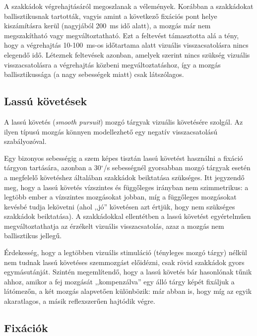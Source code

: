 A szakkádok végrehajtásáról megoszlanak a vélemények. Korábban a szakkádokat ballisztikusnak tartották, vagyis amint a következő fixációs pont helye kiszámításra kerül (nagyjából 200~ms idő alatt), a mozgás már nem megszakítható vagy megváltoztatható. \cite{carpenter_book} Ezt a feltevést támasztotta alá a tény, hogy a végrehajtás 10-100~ms-os időtartama alatt vizuális visszacsatolásra nincs elegendő idő. Léteznek feltevések azonban, amelyek szerint nincs szükség vizuális visszacsatolásra a végrehajtás közbeni megváltoztatáshoz, így a mozgás ballisztikussága (a nagy sebességek miatt) csak látszólagos. \cite{zee}

\subsection{Lassú követések}\label{sect:lassukovetes}

A lassú követés (\emph{smooth pursuit}) mozgó tárgyak vizuális követésére szolgál. Az ilyen típusú mozgás könnyen modellezhető egy negatív visszacsatolású szabályozóval. \cite{carpenter_book}

Egy bizonyos sebességig a szem képes tisztán lassú követést használni a fixáció tárgyon tartására, azonban a 30$^{\circ}$/s sebességnél gyorsabban mozgó tárgyak esetén a megfelelő követéshez általában szakkádok beiktatása szükséges. Itt jegyzendő meg, hogy a lassú követés vízszintes és függőleges irányban nem szimmetrikus: a legtöbb ember a vízszintes mozgásokat jobban, míg a függőleges mozgásokat kevésbé tudja lekövetni (ahol ,,jó'' követésen azt értjük, hogy nem szükséges szakkádok beiktatása). A szakkádokkal ellentétben a lassú követést egyértelműen megváltoztathatja az érzékelt vizuális visszacsatolás, azaz a mozgás nem ballisztikus jellegű.

Érdekesség, hogy a legtöbben vizuális stimuláció (tényleges mozgó tárgy) nélkül nem tudnak lassú követéses szemmozgást előidézni, csak rövid szakkádok gyors egymásutánját. Szintén megemlítendő, hogy a lassú követés bár hasonlónak tűnik ahhoz, amikor a fej mozgását ,,kompenzálva'' egy álló tárgy képét fixáljuk a látómezőn, a két mozgás alapvetően különbözik: már abban is, hogy míg az egyik akaratlagos, a másik reflexszerűen hajtódik végre.

\subsection{Fixációk}\label{sect:fixaciok}

